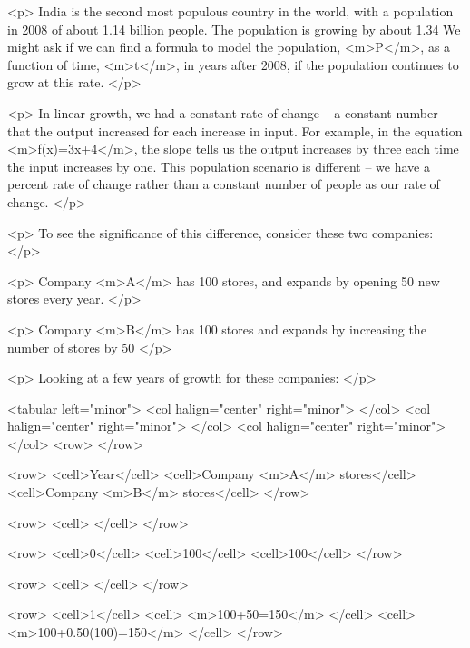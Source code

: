         <p>
            India is the second most populous country in the world, with a population in 2008 of about 1.14 billion people.
            The population is growing by about 1.34%
            We might ask if we can find a formula to model the population, <m>P</m>, as a function of time, <m>t</m>, in years after 2008, if the population continues to grow at this rate.
        </p>

        <p>
            In linear growth, we had a constant rate of change – a constant number that the output increased for each increase in input.
            For example, in the equation <m>f(x)=3x+4</m>, the slope tells us the output increases by three each time the input increases by one.
            This population scenario is different – we have a percent rate of change rather than a constant number of people as our rate of change.
        </p>

        <p>
            To see the significance of this difference, consider these two companies:
        </p>

        <p>
            Company <m>A</m> has 100 stores, and expands by opening 50 new stores every year.
        </p>

        <p>
            Company <m>B</m> has 100 stores and expands by increasing the number of stores by 50%
        </p>

        <p>
            Looking at a few years of growth for these companies:
        </p>

        <tabular left="minor">
            <col halign="center" right="minor"> </col> <col halign="center" right="minor"> </col> <col halign="center" right="minor"> </col>
            <row>
            </row>

            <row>
                <cell>Year</cell>
                <cell>Company <m>A</m> stores</cell>
                <cell>Company <m>B</m> stores</cell>
            </row>

            <row>
                <cell> </cell>
            </row>

            <row>
                <cell>0</cell>
                <cell>100</cell>
                <cell>100</cell>
            </row>

            <row>
                <cell> </cell>
            </row>

            <row>
                <cell>1</cell>
                <cell> <m>100+50=150</m> </cell>
                <cell> <m>100+0.50(100)=150</m> </cell>
            </row>

